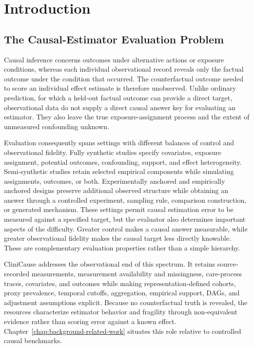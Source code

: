 \chapter{Introduction}
\label{chap:introduction}

\section{The Causal-Estimator Evaluation Problem}
\label{sec:introduction:causal-estimator-evaluation-problem}

Causal inference concerns outcomes under alternative actions or exposure conditions, whereas each individual observational record reveals only the factual outcome under the condition that occurred.  The counterfactual outcome needed to score an individual effect estimate is therefore unobserved.  Unlike ordinary prediction, for which a held-out factual outcome can provide a direct target, observational data do not supply a direct causal answer key for evaluating an estimator.  They also leave the true exposure-assignment process and the extent of unmeasured confounding unknown.

Evaluation consequently spans settings with different balances of control and observational fidelity.  Fully synthetic studies specify covariates, exposure assignment, potential outcomes, confounding, support, and effect heterogeneity.  Semi-synthetic studies retain selected empirical components while simulating assignments, outcomes, or both.  Experimentally anchored and empirically anchored designs preserve additional observed structure while obtaining an answer through a controlled experiment, sampling rule, comparison construction, or generated mechanism.  These settings permit causal estimation error to be measured against a specified target, but the evaluator also determines important aspects of the difficulty.  Greater control makes a causal answer measurable, while greater observational fidelity makes the causal target less directly knowable.  These are complementary evaluation properties rather than a simple hierarchy.

CliniCause addresses the observational end of this spectrum.  It retains source-recorded measurements, measurement availability and missingness, care-process traces, covariates, and outcomes while making representation-defined cohorts, proxy prevalence, temporal cutoffs, aggregation, empirical support, DAGs, and adjustment assumptions explicit.  Because no counterfactual truth is revealed, the resources characterize estimator behavior and fragility through non-equivalent evidence rather than scoring error against a known effect.  Chapter~\ref{chap:background-related-work} situates this role relative to controlled causal benchmarks.

